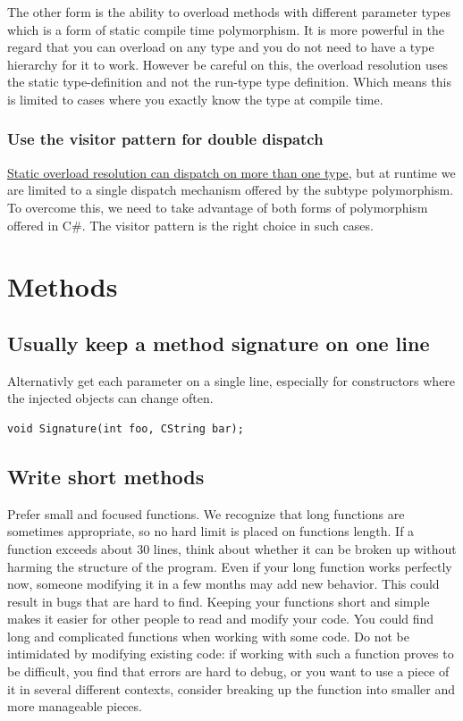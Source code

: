 \documentclass[11pt,a4paper]{article}
\begin{document}
The other form is the ability to overload methods with different parameter types which is a form of static compile time polymorphism. It is more powerful in the regard that you can overload on any type and you do not need to have a type hierarchy for it to work. However be careful on this, the overload resolution uses the static type-definition and not the run-type type definition. Which means this is limited to cases where you exactly know the type at compile time.

\subsubsection{Use the visitor pattern for double dispatch}

\href{https://eli.thegreenplace.net/2016/a-polyglots-guide-to-multiple-dispatch/}{Static overload resolution can dispatch on more than one type}, but at runtime we are limited to a single dispatch mechanism offered by the subtype polymorphism. To overcome this, we need to take advantage of both forms of polymorphism offered in C\#. The visitor pattern is the right choice in such cases.

\section{Methods}

\subsection{Usually keep a method signature on one line}

Alternativly get each parameter on a single line, especially for constructors where the injected objects can change often.

\begin{lstlisting}[language={[Sharp]C}, caption={Function signature}]
void Signature(int foo, CString bar);
\end{lstlisting}

\subsection{Write short methods}

Prefer small and focused functions.
We recognize that long functions are sometimes appropriate, so no hard limit is placed on functions length. If a function exceeds about 30 lines, think about whether it can be broken up without harming the structure of the program.
Even if your long function works perfectly now, someone modifying it in a few months may add new behavior. This could result in bugs that are hard to find. Keeping your functions short and simple makes it easier for other people to read and modify your code.
You could find long and complicated functions when working with some code. Do not be intimidated by modifying existing code: if working with such a function proves to be difficult, you find that errors are hard to debug, or you want to use a piece of it in several different contexts, consider breaking up the function into smaller and more manageable pieces.
\end{document}
